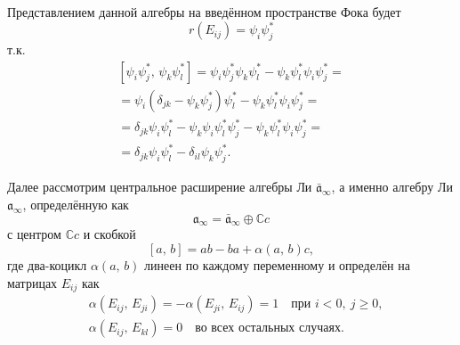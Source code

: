 \documentclass[a4paper, 14pt]{extarticle}
\begin{document}
Представлением данной алгебры
на введённом пространстве Фока будет
\begin{equation}
	r(E_{ij})=\psi_i \psi_j^{*}
\end{equation} 
т.\:к.
\begin{multline}
	\left[ \psi_i \psi^*_j,\,\psi_k \psi^*_l \right] 
	=\psi_i \psi_j^* \psi_k \psi^*_l -\psi_k \psi^*_l
	\psi_i \psi^*_j=\\=\psi_i \left( \delta_{jk} -\psi_k \psi_j^* \right) \psi^*_l-\psi_k \psi_l^* \psi_i \psi^*_j=\\=\delta_{jk}\psi_i \psi^*_l-\psi_k \psi_i  \psi_l^*
	\psi_j^*-\psi_k \psi_l^* \psi_i \psi_j^*=\\=
	\delta_{jk} \psi_i \psi_{l}^*-
	\delta_{il}\psi_k \psi_j^*
.\end{multline}

Далее рассмотрим центральное расширение алгебры Ли
$\bar{\mathfrak{a}}_\infty$, а именно алгебру Ли $\mathfrak{a}_\infty$, определённую как
\begin{equation}
	\mathfrak{a}_\infty= \bar{\mathfrak{a}}_\infty
	\oplus  \mathbb{C}c
\end{equation} 
с центром $\mathbb{C}c$ и скобкой
\begin{equation}
	\left[ a,\,b \right] =ab-ba+ \alpha\left( a,\,b \right) c
,\end{equation} 
где два-коцикл $\alpha(a,\,b)$ линеен по каждому
переменному и определён на матрицах $E_{ij}$ как
\begin{equation}
	\begin{aligned}
		&\alpha\left( E_{ij},\,E_{ji} \right) =-\alpha
	\left( E_{ji},\,E_{ij} \right) =1\quad
	\text{при } i< 0,\ j\ge 0,\\
	&\alpha\left( E_{ij},\,E_{kl} \right) =0
		\quad \text{во всех остальных случаях.}
	\end{aligned}
	\label{}
\end{equation}
\end{document}
